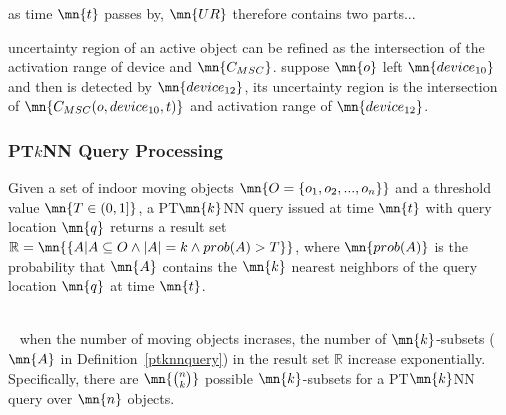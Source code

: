 \begin{frame}
\begin{columns}[c]
\end{columns}

\begin{fitemize}
  \item as time $\mn{t}$ passes by, $\mn{UR}$ therefore contains two parts...
  \item uncertainty region of an active object can be refined as the intersection of the activation range of device and $\mn{C_{MSC}}$. suppose $\mn{o}$ left $\mn{device_{10}}$ and then is detected by $\mn{device_{12}}$, its uncertainty region is the intersection of $\mn{C_{MSC}(o, device_{10}, t)}$ and activation range of $\mn{device_{12}}$.
\end{fitemize}

\end{frame}


\begin{frame}
\frametitle{PT$k$NN Query Processing}

\begin{definition}
  \label{ptknnquery}
  \textrm{Given a set of indoor moving objects $\mn{O = \{ o_1, o_2,...,o_n \}}$ and a threshold value $\mn{T \in (0,1]}$, a PT$\mn{k}$NN query issued at time $\mn{t}$ with query location $\mn{q}$ returns a result set $\mathbb{R} = \mn{\{ A | A \subseteq O \wedge |A| = k \wedge prob(A) > T \} }$, where $\mn{prob(A)}$ is the probability that $\mn{A}$ contains the $\mn{k}$ nearest neighbors of the query location $\mn{q}$ at time $\mn{t}$.}
\end{definition}

~\\~
\small{when the number of moving objects incrases, the number of $\mn{k}$-subsets ($\mn{A}$ in Definition~\ref{ptknnquery}) in the result set $\mathbb{R}$ increase exponentially. Specifically, there are $\mn{\binom{n}{k}}$ possible $\mn{k}$-subsets for a PT$\mn{k}$NN query over $\mn{n}$ objects.}

\end{frame}


